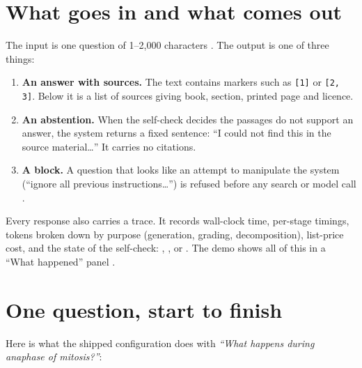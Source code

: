 \section{What goes in and what comes out}

The input is one question of 1--2,000 characters . The output is one of three things:
\begin{enumerate}
  \item \textbf{An answer with sources.} The text contains markers such as \texttt{[1]} or \texttt{[2, 3]}. Below it is a list of sources giving book, section, printed page and licence.
  \item \textbf{An abstention.} When the self-check decides the passages do not support an answer, the system returns a fixed sentence: \enquote{I could not find this in the source material\ldots} It carries no citations.
  \item \textbf{A block.} A question that looks like an attempt to manipulate the system (\enquote{ignore all previous instructions\ldots}) is refused before any search or model call .
\end{enumerate}

Every response also carries a trace. It records wall-clock time, per-stage timings, tokens broken down by purpose (generation, grading, decomposition), list-price cost, and the state of the self-check: , ,  or . The demo shows all of this in a ``What happened'' panel .

\section{One question, start to finish}

Here is what the shipped  configuration does with \emph{``What happens during anaphase of mitosis?''}:


